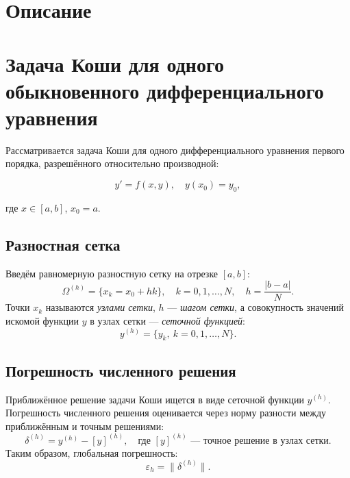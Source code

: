 

\section*{Описание}

\section{Задача Коши для одного обыкновенного дифференциального уравнения}
Рассматривается задача Коши для одного дифференциального уравнения первого порядка, разрешённого относительно производной:

\begin{equation}
    y' = f(x, y), \quad y(x_0) = y_0,
    \tag{4.1}
\end{equation}

где \( x \in [a, b] \), \( x_0 = a \). 

\subsection{Разностная сетка}
Введём равномерную разностную сетку на отрезке \([a, b]\):
\[
    \Omega^{(h)} = \{x_k = x_0 + hk\}, \quad k = 0, 1, \dots, N, \quad h = \frac{|b - a|}{N}.
\]
Точки \( x_k \) называются \textit{узлами сетки}, \( h \) — \textit{шагом сетки}, а совокупность значений искомой функции \( y \) в узлах сетки — \textit{сеточной функцией}:
\[
    y^{(h)} = \{y_k, \ k = 0, 1, \dots, N\}.
\]

\subsection{Погрешность численного решения}
Приближённое решение задачи Коши ищется в виде сеточной функции \( y^{(h)} \). Погрешность численного решения оценивается через норму разности между приближённым и точным решениями:
\[
    \delta^{(h)} = y^{(h)} - [y]^{(h)}, \quad \text{где } [y]^{(h)} \text{ — точное решение в узлах сетки}.
\]
Таким образом, глобальная погрешность:
\[
    \varepsilon_h = \|\delta^{(h)}\|.
\]


